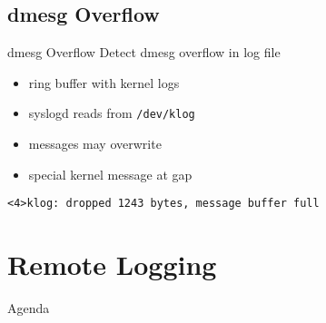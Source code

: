 \documentclass[14pt]{beamer}
\begin{document}
\subsection{dmesg Overflow}
\begin{frame}{dmesg Overflow}
    Detect dmesg overflow in log file
\begin{itemize}
    \item ring buffer with kernel logs
    \item syslogd reads from \texttt{/dev/klog}
    \item messages may overwrite
    \item special kernel message at gap
\end{itemize}
    \vspace{.5cm}
    \texttt{<4>klog:\ dropped 1243 bytes, message buffer full}
\end{frame}

\section{Remote Logging}

\begin{frame}{Agenda}
\tableofcontents[currentsection]
\end{frame}
\end{document}
